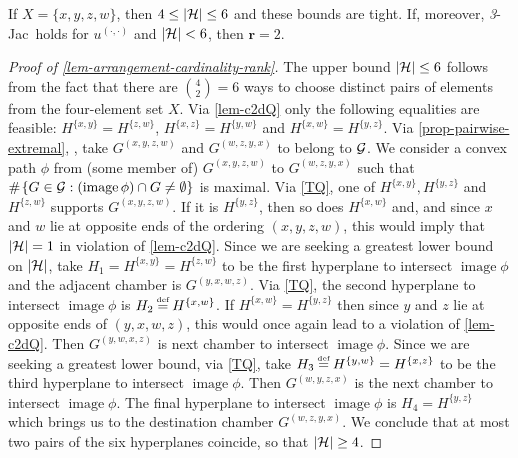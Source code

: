 \documentclass[12pt,a4paper,twoside]{article}
\makeatletter
\newcommand{\srcsize}{\@setfontsize{\srcsize}{3pt}{3pt}}
\newcommand\mdoubleplus{\text{\srcsize$+\mkern-2mu+$}}
\newcommand{\countof}{\mathbin{\#}\hskip1pt}
\newcommand{\dd}{{(\cdot,\cdot)}}
\newcommand{\threejac}{\textup{\textit{3}-Jac}}
\DeclareMathOperator{\image}{image}
\makeatother
\begin{document}
\begin{appendices}
\begin{proposition}\label{lem-arrangement-cardinality-rank}
  If $X = \{ x, y , z , w\}$, then $4 \leq \lvert \mathcal H \rvert \leq 6$ and
  these bounds are tight. If, moreover, \threejac\ holds for $u^{\dd}$ and
  $\lvert \mathcal H \rvert < 6$, then $\mathbf{r} = 2$.
\end{proposition}
\begin{proof}[Proof of \cref{lem-arrangement-cardinality-rank}]
  The upper bound $\lvert \mathcal H \rvert \leq 6$ follows from the fact that there
  are $\binom{4}{2} = 6$ ways to choose distinct pairs of elements from the
  four-element set $X$.  Via \cref{lem-c2dQ} only the following equalities are
  feasible: $H^{\{x,y\}} = H^{\{z,w\}}$, $H^{\{x,z\}} = H^{\{y,w\}}$ and
  $H^{\{x,w\}} = H^{\{y,z\}}$.  Via \cref{prop-pairwise-extremal}, \withoutlog, take
  $G^{(x,y,z,w)}$ and $G^{(w,z,y,x)}$ to belong to $\mathcal G$. We consider a
  convex path $\phi$ from (some member of) $G^{(x,y,z,w)}$ to $G^{(w,z,y,x)}$
  such that $\countof \{G \in \mc G: (\image \phi) \cap G \neq \emptyset \}$ is
  maximal. Via \ref{TQ}, one of $H^{\{x,y\}} , H^{\{y,z\}}$ and $H^{\{z,w\}}$
  supports $G^{(x,y,z,w)}$.  If it is $H^{\{y,z\}}$, then so does $H^{\{x,w\}}$
  and, and since $x$ and $w$ lie at opposite ends of the ordering $(x,y,z,w)$,
  this would imply that $\lvert\mathcal H \rvert = 1$ in violation of
  \cref{lem-c2dQ}. Since we are seeking a greatest lower bound on
  $\lvert \mathcal H \rvert$, take $H_{1} = H^{\{x,y\}} = H^{\{z,w\}}$ to be the
  first hyperplane to intersect $\image \phi$ and the adjacent chamber is
  $G^{(y,x,w,z)}$.  Via \ref{TQ}, the second hyperplane to intersect
  $\image \phi$ is $H_{2} \defeq H^{\{x,w\}}$. If $H^{\{x,w\}} = H^{\{y,z\}}$
  then since $y$ and $z$ lie at opposite ends of $(y,x,w,z)$, this would once
  again lead to a violation of \cref{lem-c2dQ}. Then $G^{(y,w,x,z)}$ is next
  chamber to intersect $\image \phi$. Since we are seeking a greatest lower
  bound, via \ref{TQ}, take $H_{3} \defeq H^{\{y,w\}} = H^{\{x,z\}}$ to be the
  third hyperplane to intersect $\image \phi$. Then $G^{(w,y,z,x)}$ is the next
  chamber to intersect $\image \phi$. The final hyperplane to intersect
  $\image \phi$ is $H_{4} = H^{\{y,z\}}$ which brings us to the destination
  chamber $G^{(w,z,y,x)}$.  We conclude that at most two pairs of the six
  hyperplanes coincide, so that $\lvert \mathcal H \rvert \geq 4$.
  

\end{proof}
\end{appendices}
\end{document}
